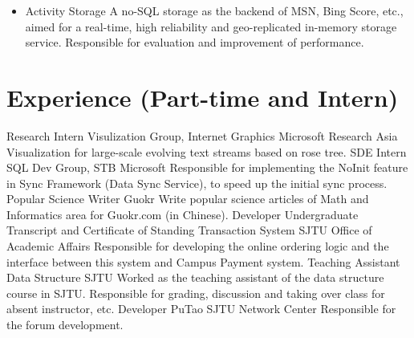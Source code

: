 \documentclass[10pt,a4paper,roman]{moderncv} %
\begin{document}
{\begin{itemize}
\begin{itemize}
                     The image storage backend for Bing Score.\newline{}%
                     Responsible for a performance test framework on Azure for this storage.
               \item Activity Storage\newline{}%
                     A no-SQL storage as the backend of MSN, Bing Score, etc., aimed for a real-time, high reliability and geo-replicated in-memory storage service.\newline{}%
                     Responsible for evaluation and improvement of performance.
               \end{itemize}
         \end{itemize}}

\section{Experience (Part-time and Intern)}
        {Research Intern}
        {Visulization Group, Internet Graphics}
        {Microsoft Research Asia}
        {}
        {Visualization for large-scale evolving text streams based on rose tree.\footnotemark[3]{}}
        {SDE Intern}
        {SQL Dev Group, STB}
        {Microsoft}
        {}
        {Responsible for implementing the NoInit feature in Sync Framework (Data Sync Service), to speed up the initial sync process.}
        {Popular Science Writer}
        {}
        {Guokr\footnotemark[4]{}}
        {}
        {Write popular science articles\footnotemark[5]{} of Math and Informatics area for Guokr.com (in Chinese).}
        {Developer}
        {Undergraduate Transcript and Certificate of Standing Transaction System}
        {SJTU Office of Academic Affairs}
        {}
        {Responsible for developing the online ordering logic and the interface between this system and Campus Payment system.}
        {Teaching Assistant}
        {Data Structure}
        {SJTU}
        {}
        {Worked as the teaching assistant of the data structure course in SJTU.\newline{}%
         Responsible for grading, discussion and taking over class for absent instructor\footnotemark[6]{}, etc.}
        {Developer}
        {PuTao\footnotemark[7]{}}
        {SJTU Network Center}
        {}
        {Responsible for the forum development.}
\end{document}
